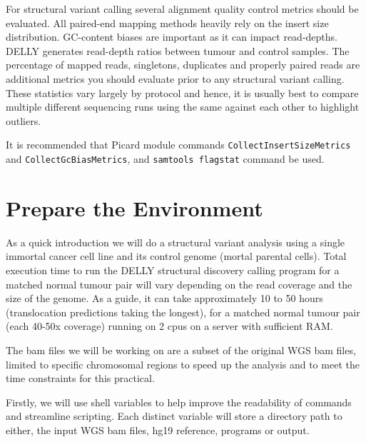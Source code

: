 \begin{information}
For structural variant calling several alignment quality control metrics should be evaluated. All paired-end mapping methods heavily rely on the insert size distribution. GC-content biases are important as it can impact read-depths. DELLY generates read-depth ratios between tumour and control samples. The percentage of mapped reads, singletons, duplicates and properly paired reads are additional metrics you should evaluate prior to any structural variant calling. These statistics vary largely by protocol and hence, it is usually best to compare multiple different sequencing runs using the same against each other to highlight outliers. 

It is recommended that Picard module commands \texttt{CollectInsertSizeMetrics} and \texttt{CollectGcBiasMetrics}, and \texttt{samtools flagstat} command be used. 

\end{information}

\section{Prepare the Environment}

\begin{note}
As a quick introduction we will do a structural variant analysis using a single immortal cancer cell line and its control genome (mortal parental cells). Total execution time to run the DELLY structural discovery calling program for a matched normal tumour pair will vary depending on the read coverage and the size of the genome. As a guide, it can take approximately 10 to 50 hours (translocation predictions taking the longest), for a matched normal tumour pair (each 40-50x coverage) running on 2 cpus on a server with sufficient RAM.

The bam files we will be working on are a subset of the original WGS bam files, limited to specific chromosomal regions to speed up the analysis and to meet the time constraints for this practical. 
\end{note}

\begin{information}
Firstly, we will use shell variables to help improve the readability of commands and streamline scripting. Each distinct variable will store a directory path to either, the input WGS bam files, hg19 reference, programs or output.

\end{information}

